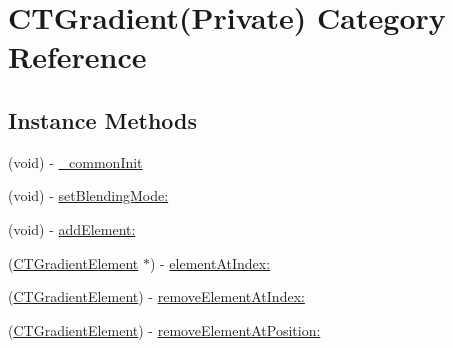 \hypertarget{category_c_t_gradient_07_private_08}{\section{C\-T\-Gradient(Private) Category Reference}
\label{category_c_t_gradient_07_private_08}
}
\subsection*{Instance Methods}
\begin{DoxyCompactItemize}
\item 
(void) -\/ \hyperlink{category_c_t_gradient_07_private_08_afbf23cc4bb96d872a9f83dc32c21216b}{\-\_\-common\-Init}
\item 
(void) -\/ \hyperlink{category_c_t_gradient_07_private_08_a84c74a4a5b2a834744e6df340697df4a}{set\-Blending\-Mode\-:}
\item 
(void) -\/ \hyperlink{category_c_t_gradient_07_private_08_a2e9759470b35177bc3a299380b1800f6}{add\-Element\-:}
\item 
(\hyperlink{_c_t_gradient_8h_a72305f763c1887d41821fe2382b8ae27}{C\-T\-Gradient\-Element} $\ast$) -\/ \hyperlink{category_c_t_gradient_07_private_08_a0d3e3a54045665b5c6da5db2d07fe288}{element\-At\-Index\-:}
\item 
(\hyperlink{_c_t_gradient_8h_a72305f763c1887d41821fe2382b8ae27}{C\-T\-Gradient\-Element}) -\/ \hyperlink{category_c_t_gradient_07_private_08_a9a24753402198454e5b766c906d4b831}{remove\-Element\-At\-Index\-:}
\item 
(\hyperlink{_c_t_gradient_8h_a72305f763c1887d41821fe2382b8ae27}{C\-T\-Gradient\-Element}) -\/ \hyperlink{category_c_t_gradient_07_private_08_a712374a561a7ba285547c6c7991f7a99}{remove\-Element\-At\-Position\-:}
\end{DoxyCompactItemize}


